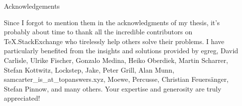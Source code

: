 
\cleardoublepage
\thispagestyle{empty}

{}

\begin{center}
{\color{accentcolor2} \mainregular \Huge Acknowledgements} 
\end{center}
\vspace{1cm}

Since I forgot to mention them in the acknowledgments of my thesis, it's probably about time to thank all the incredible contributors on TeX.StackExchange who tirelessly help others solve their problems. I have particularly benefited from the insights and solutions provided by egreg, David Carlisle, Ulrike Fischer, Gonzalo Medina, Heiko Oberdiek, Martin Scharrer, Stefan Kottwitz, Lockstep, Jake, Peter Grill, Alan Munn, samcarter\_is\_at\_topanswers.xyz, Moewe, Percusse, Christian Feuersänger, Stefan Pinnow, and many others. Your expertise and generosity are truly appreciated!